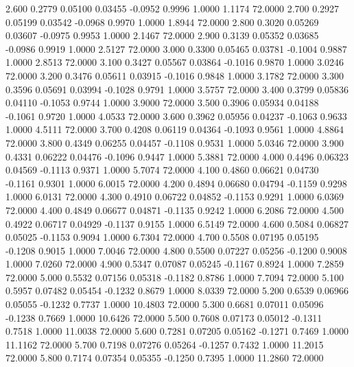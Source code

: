    2.600   0.2779   0.05100   0.03455  -0.0952   0.9996   1.0000   1.1174  72.0000
   2.700   0.2927   0.05199   0.03542  -0.0968   0.9970   1.0000   1.8944  72.0000
   2.800   0.3020   0.05269   0.03607  -0.0975   0.9953   1.0000   2.1467  72.0000
   2.900   0.3139   0.05352   0.03685  -0.0986   0.9919   1.0000   2.5127  72.0000
   3.000   0.3300   0.05465   0.03781  -0.1004   0.9887   1.0000   2.8513  72.0000
   3.100   0.3427   0.05567   0.03864  -0.1016   0.9870   1.0000   3.0246  72.0000
   3.200   0.3476   0.05611   0.03915  -0.1016   0.9848   1.0000   3.1782  72.0000
   3.300   0.3596   0.05691   0.03994  -0.1028   0.9791   1.0000   3.5757  72.0000
   3.400   0.3799   0.05836   0.04110  -0.1053   0.9744   1.0000   3.9000  72.0000
   3.500   0.3906   0.05934   0.04188  -0.1061   0.9720   1.0000   4.0533  72.0000
   3.600   0.3962   0.05956   0.04237  -0.1063   0.9633   1.0000   4.5111  72.0000
   3.700   0.4208   0.06119   0.04364  -0.1093   0.9561   1.0000   4.8864  72.0000
   3.800   0.4349   0.06255   0.04457  -0.1108   0.9531   1.0000   5.0346  72.0000
   3.900   0.4331   0.06222   0.04476  -0.1096   0.9447   1.0000   5.3881  72.0000
   4.000   0.4496   0.06323   0.04569  -0.1113   0.9371   1.0000   5.7074  72.0000
   4.100   0.4860   0.06621   0.04730  -0.1161   0.9301   1.0000   6.0015  72.0000
   4.200   0.4894   0.06680   0.04794  -0.1159   0.9298   1.0000   6.0131  72.0000
   4.300   0.4910   0.06722   0.04852  -0.1153   0.9291   1.0000   6.0369  72.0000
   4.400   0.4849   0.06677   0.04871  -0.1135   0.9242   1.0000   6.2086  72.0000
   4.500   0.4922   0.06717   0.04929  -0.1137   0.9155   1.0000   6.5149  72.0000
   4.600   0.5084   0.06827   0.05025  -0.1153   0.9094   1.0000   6.7304  72.0000
   4.700   0.5508   0.07195   0.05195  -0.1208   0.9015   1.0000   7.0046  72.0000
   4.800   0.5500   0.07227   0.05256  -0.1200   0.9008   1.0000   7.0260  72.0000
   4.900   0.5347   0.07087   0.05245  -0.1167   0.8924   1.0000   7.2859  72.0000
   5.000   0.5532   0.07156   0.05318  -0.1182   0.8786   1.0000   7.7094  72.0000
   5.100   0.5957   0.07482   0.05454  -0.1232   0.8679   1.0000   8.0339  72.0000
   5.200   0.6539   0.06966   0.05055  -0.1232   0.7737   1.0000  10.4803  72.0000
   5.300   0.6681   0.07011   0.05096  -0.1238   0.7669   1.0000  10.6426  72.0000
   5.500   0.7608   0.07173   0.05012  -0.1311   0.7518   1.0000  11.0038  72.0000
   5.600   0.7281   0.07205   0.05162  -0.1271   0.7469   1.0000  11.1162  72.0000
   5.700   0.7198   0.07276   0.05264  -0.1257   0.7432   1.0000  11.2015  72.0000
   5.800   0.7174   0.07354   0.05355  -0.1250   0.7395   1.0000  11.2860  72.0000

